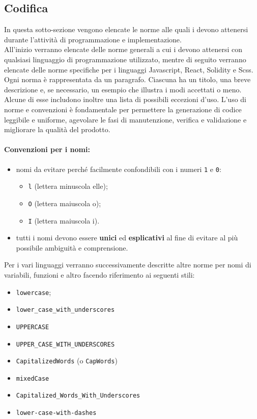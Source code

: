 \documentclass[NormeDiProgetto.tex]{subfiles}
\begin{document}
\subsection{Codifica}
In questa sotto-sezione vengono elencate le norme alle quali i \progri devono attenersi durante l'attività di programmazione e implementazione.\\
All'inizio verranno elencate delle norme generali a cui i \progri devono attenersi con qualsiasi linguaggio di programmazione utilizzato, mentre di seguito verranno elencate delle norme specifiche per i linguaggi Javascript, React, Solidity e Scss.\\
Ogni norma è rappresentata da un paragrafo. Ciascuna ha un titolo, una breve descrizione e, se necessario, un esempio che illustra i modi accettati o meno. Alcune di esse includono inoltre una lista di possibili eccezioni d'uso. L'uso di norme e convenzioni è fondamentale per permettere la generazione di codice leggibile e uniforme, agevolare le fasi di manutenzione, verifica e validazione e migliorare la qualità del prodotto.

\paragraph*{Convenzioni per i nomi: }
\begin{itemize}
	\item nomi da evitare perché facilmente confondibili con i numeri \texttt{1} e \texttt{0}:
	\begin{itemize}
		\item \texttt{l} (lettera minuscola elle);
		\item \texttt{O} (lettera maiuscola o);
		\item \texttt{I} (lettera maiuscola i).
	\end{itemize}
	\item tutti i nomi devono essere \textbf{unici} ed \textbf{esplicativi} al fine di evitare al più possibile ambiguità e comprensione.
\end{itemize}
Per i vari linguaggi verranno successivamente descritte altre norme per nomi di variabili, funzioni e altro facendo riferimento ai seguenti stili:
\begin{itemize}
	\item \texttt{lowercase};
	\item \texttt{lower\_case\_with\_underscores}
	\item \texttt{UPPERCASE}
	\item \texttt{UPPER\_CASE\_WITH\_UNDERSCORES}
	\item \texttt{CapitalizedWords} (o \texttt{CapWords})
	\item \texttt{mixedCase}
	\item \texttt{Capitalized\_Words\_With\_Underscores}
	\item \texttt{lower-case-with-dashes}	
\end{itemize}
\end{document}
